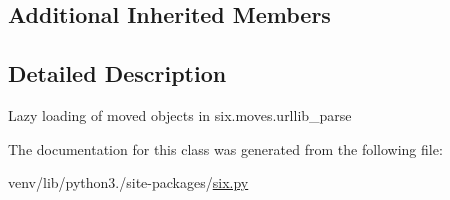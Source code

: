 \subsection*{Additional Inherited Members}


\subsection{Detailed Description}
\begin{DoxyVerb}Lazy loading of moved objects in six.moves.urllib_parse\end{DoxyVerb}
 

The documentation for this class was generated from the following file\+:\begin{DoxyCompactItemize}
\item 
venv/lib/python3./site-\/packages/\hyperlink{six_8py}{six.\+py}\end{DoxyCompactItemize}
